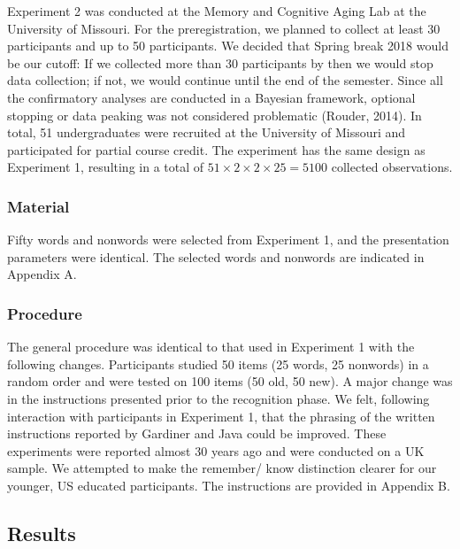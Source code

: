 \documentclass[english,,man,floatsintext]{apa6}
\begin{document}
Experiment 2 was conducted at the Memory and Cognitive Aging Lab at the University of Missouri. For the preregistration, we planned to collect at least 30 participants and up to 50 participants. We decided that Spring break 2018 would be our cutoff: If we collected more than 30 participants by then we would stop data collection; if not, we would continue until the end of the semester. Since all the confirmatory analyses are conducted in a
Bayesian framework, optional stopping or data peaking was not considered problematic (Rouder, 2014). In total, 51 undergraduates were recruited at the University of Missouri and participated for partial course credit. The experiment has the same design as Experiment 1, resulting in a total of \(51 \times 2 \times 2 \times 25 = 5100\) collected observations.

\hypertarget{material-1}{%
\subsubsection{Material}\label{material-1}}

Fifty words and nonwords were selected from Experiment 1, and the presentation parameters were identical. The selected words and nonwords are indicated in Appendix A.

\hypertarget{procedure-1}{%
\subsubsection{Procedure}\label{procedure-1}}

The general procedure was identical to that used in Experiment 1 with the following changes. Participants studied 50 items (25 words, 25 nonwords) in a random order and were tested on 100 items (50 old, 50 new). A major change was in the instructions presented prior to the recognition phase. We felt, following interaction with participants in Experiment 1, that the phrasing of the written instructions reported by Gardiner and Java could be improved. These experiments were reported almost 30 years ago and were conducted on a UK sample. We attempted to make the remember/ know distinction clearer for our younger, US educated participants. The instructions are provided in Appendix B.

\hypertarget{results-1}{%
\subsection{Results}\label{results-1}}
\end{document}

